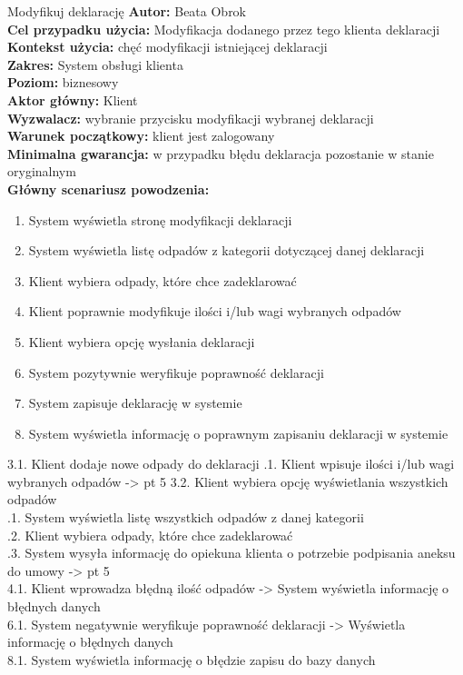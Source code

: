 \begin{usecase}{Modyfikuj deklarację}
	\textbf{Autor:} Beata Obrok \\
	\textbf{Cel przypadku użycia:} Modyfikacja dodanego przez tego klienta deklaracji \\
	\textbf{Kontekst użycia:} chęć modyfikacji istniejącej deklaracji\\
	\textbf{Zakres:} System obsługi klienta \\
	\textbf{Poziom:} biznesowy \\
	\textbf{Aktor główny:} Klient\\
	\textbf{Wyzwalacz:} wybranie przycisku modyfikacji wybranej deklaracji \\
	\textbf{Warunek początkowy:} klient jest zalogowany\\
	\textbf{Minimalna gwarancja:} w przypadku błędu deklaracja pozostanie w stanie oryginalnym \\
	\textbf{Główny scenariusz powodzenia:} \\
		\begin{enumerate}
			\item System wyświetla stronę modyfikacji deklaracji
			\item System wyświetla listę odpadów z kategorii dotyczącej danej deklaracji
			\item Klient wybiera odpady, które chce zadeklarować
			\item Klient poprawnie modyfikuje ilości i/lub wagi wybranych odpadów
			\item Klient wybiera opcję wysłania deklaracji
			\item System pozytywnie weryfikuje poprawność deklaracji
			\item System zapisuje deklarację w systemie
			\item System wyświetla informację o poprawnym zapisaniu deklaracji w systemie
		\end{enumerate}
			3.1. Klient dodaje nowe odpady do deklaracji
				.1. Klient wpisuje ilości i/lub wagi wybranych odpadów -> pt 5
			3.2. Klient wybiera opcję wyświetlania wszystkich odpadów \\
				.1. System wyświetla listę wszystkich odpadów z danej kategorii \\
				.2. Klient wybiera odpady, które chce zadeklarować \\
				.3. System wysyła informację do opiekuna klienta o potrzebie podpisania aneksu do umowy -> pt 5 \\
			4.1. Klient wprowadza błędną ilość odpadów -> System wyświetla informację o błędnych danych \\
			6.1. System negatywnie weryfikuje poprawność deklaracji -> Wyświetla informację o błędnych danych \\
			8.1. System wyświetla informację o błędzie zapisu do bazy danych \\
\end{usecase}

